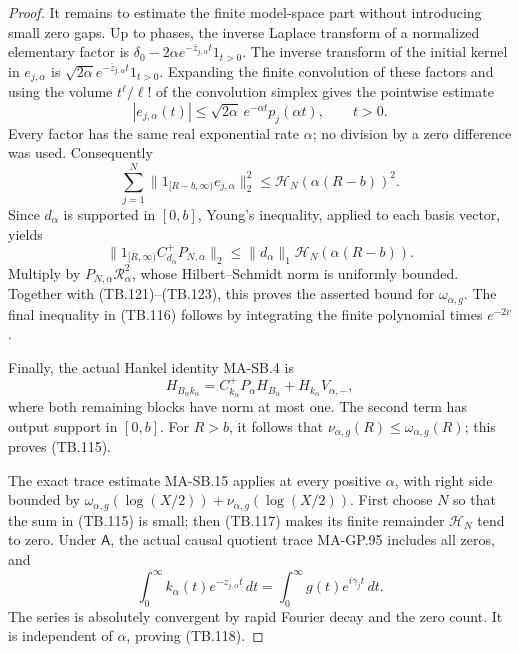 \begin{proof}
It remains to estimate the finite model-space part
without introducing small zero gaps.
Up to phases, the inverse Laplace transform of a
normalized elementary factor is
\(\delta_0-2\alpha e^{-\overline z_{j,\alpha}t}1_{t>0}\).
The inverse transform of the initial kernel in
\(e_{j,\alpha}\) is
\(\sqrt{2\alpha}e^{-\overline z_{j,\alpha}t}1_{t>0}\).
Expanding the finite convolution of these factors and
using the volume \(t^\ell/\ell!\) of the convolution
simplex gives the pointwise estimate
\[
 |e_{j,\alpha}(t)|
       \leq\sqrt{2\alpha}\,e^{-\alpha t}p_j(\alpha t),
             \qquad t>0.
 \tag{TB.124}
\]
Every factor has the same real exponential rate
\(\alpha\); no division by a zero difference was used.
Consequently
\[
 \sum_{j=1}^N
      \|1_{[R-b,\infty)}e_{j,\alpha}\|_2^2
             \leq \mathcal H_N(\alpha(R-b))^2.
 \tag{TB.125}
\]
Since \(d_\alpha\) is supported in \([0,b]\), Young's
inequality, applied to each basis vector, yields
\[
 \|1_{[R,\infty)}C_{d_\alpha}^+P_{N,\alpha}\|_2
       \leq \|d_\alpha\|_1
                     \mathcal H_N(\alpha(R-b)).
 \tag{TB.126}
\]
Multiply by \(P_{N,\alpha}\mathcal R_\alpha^2\),
whose Hilbert--Schmidt norm is uniformly bounded.
Together with (TB.121)--(TB.123), this proves the
asserted bound for \(\omega_{\alpha,g}\).
The final inequality in (TB.116) follows by integrating
the finite polynomial times \(e^{-2v}\).

Finally, the actual Hankel identity MA-SB.4 is
\[
 H_{B_\alpha k_\alpha}
    =C_{k_\alpha}^+P_\alpha H_{B_\alpha}
                                      +H_{k_\alpha}V_{\alpha,-},
 \tag{TB.127}
\]
where both remaining blocks have norm at most one.
The second term has output support in \([0,b]\).
For \(R>b\), it follows that
\(\nu_{\alpha,g}(R)\leq\omega_{\alpha,g}(R)\);
this proves (TB.115).

The exact trace estimate MA-SB.15 applies at every
positive \(\alpha\), with right side bounded by
\(\omega_{\alpha,g}(\log(X/2))
 +\nu_{\alpha,g}(\log(X/2))\).
First choose \(N\) so that the sum in (TB.115) is
small; then (TB.117) makes its finite remainder
\(\mathcal H_N\) tend to zero.
Under \(\mathsf A\), the actual causal quotient trace
MA-GP.95 includes all zeros, and
\[
 \int_0^\infty k_\alpha(t)
                       e^{-z_{j,\alpha}t}\,dt
                =\int_0^\infty g(t)e^{i\gamma_jt}\,dt.
 \]
The series is absolutely convergent by rapid Fourier
decay and the zero count.
It is independent of \(\alpha\), proving (TB.118).
\end{proof}

